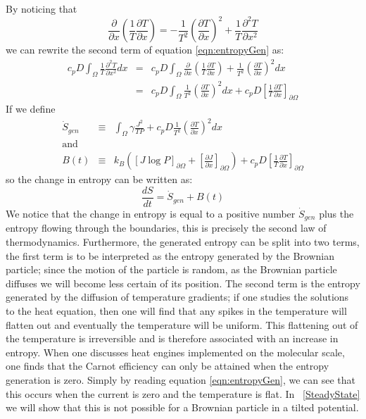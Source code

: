 By noticing that
\begin{equation}
\frac{\partial}{\partial x} \left(\frac{1}{T} \frac{\partial T}{\partial x} \right) = -\frac{1}{T^2} \left(\frac{\partial T}{\partial x} \right)^2 + \frac{1}{T} \frac{\partial^2 T}{\partial x^2}
\end{equation}
we can rewrite the second term of equation \ref{eqn:entropyGen} as:
\begin{eqnarray}
c_p D \int_{\Omega} \frac{1}{T} \frac{\partial^2 T}{\partial x^2} dx &=& c_p D \int_{\Omega} \frac{\partial}{\partial x} \left(\frac{1}{T} \frac{\partial T}{\partial x} \right) + \frac{1}{T^2} \left(\frac{\partial T}{\partial x} \right)^2 dx \\
 &=& c_p D \int_{\Omega} \frac{1}{T^2} \left(\frac{\partial T}{\partial x} \right)^2 dx + c_p D\left[\frac{1}{T} \frac{\partial T}{\partial x} \right]_{\partial \Omega}
\end{eqnarray}
If we define
\begin{eqnarray}
\dot{S}_{gen} &\equiv& \int_{\Omega} \gamma \frac{J^2}{T P} + c_p D \frac{1}{T^2} \left(\frac{\partial T}{\partial x} \right)^2 dx \label{eqn:entropyGen} \\
\text{and} \nonumber \\
B(t) &\equiv& k_B \left( [J \log P]_{\partial \Omega} + \left[\frac{\partial J}{\partial x}\right]_{\partial \Omega} \right) + c_p D\left[\frac{1}{T} \frac{\partial T}{\partial x} \right]_{\partial \Omega}
\end{eqnarray}
so the change in entropy can be written as:
\begin{equation}
\frac{d S}{d t} = \dot{S}_{gen} + B(t)
\end{equation}
We notice that the change in entropy is equal to a positive number $\dot{S}_{gen}$ plus the entropy flowing through the boundaries, this is precisely the second law of thermodynamics. Furthermore, the generated entropy can be split into two terms, the first term is to be interpreted as the entropy generated by the Brownian particle; since the motion of the particle is random, as the Brownian particle diffuses we will become less certain of its position. The second term is the entropy generated by the diffusion of temperature gradients; if one studies the solutions to the heat equation, then one will find that any spikes in the temperature will flatten out and eventually the temperature will be uniform. This flattening out of the temperature is irreversible and is therefore associated with an increase in entropy. When one discusses heat engines implemented on the molecular scale, one finds that the Carnot efficiency can only be attained when the entropy generation is zero. Simply by reading equation \ref{eqn:entropyGen}, we can see that this occurs when the current is zero and the temperature is flat. In ~\autoref{SteadyState} we will show that this is not possible for a Brownian particle in a tilted potential. 


